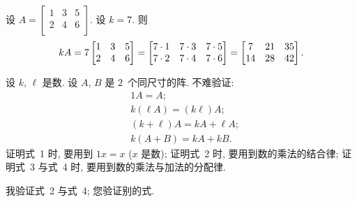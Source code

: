 \documentclass[../libro.tex]{subfiles}
\begin{document}
\begin{example}
    设
    \(
        A =
        \begin{bmatrix}
            1 & 3 & 5 \\
            2 & 4 & 6 \\
        \end{bmatrix}
    \).
    设 \(k = 7\).
    则
    \begin{equation*}
        kA
        = 7
        \begin{bmatrix}
            1 & 3 & 5 \\
            2 & 4 & 6 \\
        \end{bmatrix}
        =
        \begin{bmatrix}
            7 \cdot 1 & 7 \cdot 3 & 7 \cdot 5 \\
            7 \cdot 2 & 7 \cdot 4 & 7 \cdot 6 \\
        \end{bmatrix}
        =
        \begin{bmatrix}
            7  & 21 & 35 \\
            14 & 28 & 42 \\
        \end{bmatrix}.
        \qedhere
    \end{equation*}
\end{example}

设 \(k\), \(\ell\) 是数.
设 \(A\), \(B\) 是 \(2\)~个同尺寸的阵.
不难验证:
\begin{align*}
    & 1A = A;                     \\
    & k(\ell A) = (k\ell) A;      \\
    & (k + \ell) A = kA + \ell A; \\
    & k(A + B) = kA + kB.
\end{align*}
证明式~1 时, 要用到 \(1x = x\) (\(x\) 是数);
证明式~2 时, 要用到数的乘法的结合律;
证明式~3 与式~4 时, 要用到数的乘法与加法的分配律.

我验证式~2 与式~4;
您验证别的式.
\end{document}
